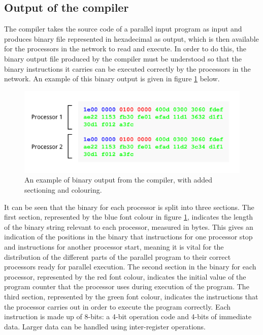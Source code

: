 \documentclass[a4paper, 12pt]{article}
\begin{document}
\subsection{Output of the compiler}

The compiler takes the source code of a parallel input program as input and produces binary file represented in hexadecimal as output, which is then available for the processors in the network to read and execute. In order to do this, the binary output file produced by the compiler must be understood so that the binary instructions it carries can be executed correctly by the processors in the network. An example of this binary output is given in figure \ref{fig:compiler_binary} below.


\begin{figure}[H]
\centering
\includegraphics[width=15cm]{compiler_binary1.png}
\caption[An example of binary output from the compiler]{An example of binary output from the compiler, with added sectioning and colouring.}
\label{fig:compiler_binary}
\end{figure}

It can be seen that the binary for each processor is split into three sections. The first section, represented by the blue font colour in figure \ref{fig:compiler_binary}, indicates the length of the binary string relevant to each processor, measured in bytes. This gives an indication of the positions in the binary that instructions for one processor stop and instructions for another processor start, meaning it is vital for the distribution of the different parts of the parallel program to their correct processors ready for parallel execution. The second section in the binary for each processor, represented by the red font colour, indicates the initial value of the program counter that the processor uses during execution of the program. The third section, represented by the green font colour, indicates the instructions that the processor carries out in order to execute the program correctly. Each instruction is made up of 8-bits: a 4-bit operation code and 4-bits of immediate data. Larger data can be handled using inter-register operations. 
\end{document}
